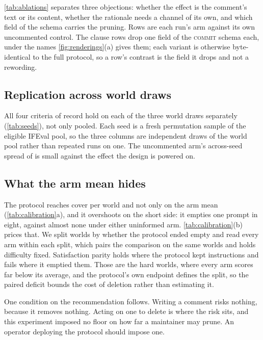 

\autoref{tab:ablations} separates three objections: whether the effect is the comment's text or its
content, whether the rationale needs a channel of its own, and which field of the schema carries the
pruning. Rows are each run's arm against its own uncommented control. The clause rows drop one
field of the \textsc{commit} schema each, under the names \autoref{fig:renderings}(a) gives them;
each variant is otherwise byte-identical to the full protocol, so a row's contrast is the field it
drops and not a rewording.

\subsection{Replication across world draws}
\label{sec:appendix:seeds}



All four criteria of record hold on each of the three world draws separately (\autoref{tab:seeds}),
not only pooled. Each seed is a fresh permutation sample of the eligible IFEval pool, so the three
columns are independent draws of the world pool rather than repeated runs on one. The uncommented
arm's across-seed spread of \LabControlSeedSdPp{} is small against the \LabPracticalDeltaExcessPp{}
effect the design is powered on.

\subsection{What the arm mean hides}
\label{sec:appendix:calibration}



The protocol reaches cover per world and not only on the arm mean
(\autoref{tab:calibration}a), and it overshoots on the short side: it empties one prompt in eight,
against almost none under either uninformed arm. \autoref{tab:calibration}(b) prices that. We split
worlds by whether the protocol ended empty and read every arm within each split, which pairs the
comparison on the same worlds and holds difficulty fixed. Satisfaction parity holds where the
protocol kept instructions and fails where it emptied them. Those are the hard worlds, where every
arm scores far below its average, and the protocol's own endpoint defines the split, so the paired
deficit bounds the cost of deletion rather than estimating it.

One condition on the recommendation follows. Writing a comment risks nothing, because it removes
nothing. Acting on one to delete is where the risk sits, and this experiment imposed no floor on
how far a maintainer may prune. An operator deploying the protocol should impose one.

